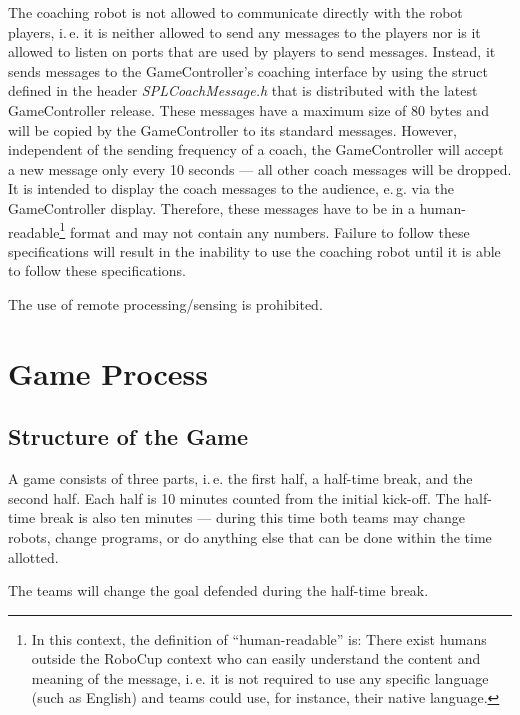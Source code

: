 \documentclass[12pt]{article}
\newcommand{\ie}{\mbox{i.\,e.}\xspace}
\newcommand{\eg}{\mbox{e.\,g.}\xspace}
\begin{document}
The coaching robot is not allowed to communicate directly with the robot players, \ie it is neither allowed to send any messages to the players nor is it allowed to listen on ports that are used by players to send messages. Instead, it sends messages to the GameController's coaching interface by using the struct defined in the header \emph{SPLCoachMessage.h} that is distributed with the latest GameController release. These messages have a maximum size of 80 bytes and will be copied by the GameController to its standard messages. However, independent of the sending frequency of a coach, the GameController will accept a new message only every 10 seconds --- all other coach messages will be dropped.  It is intended to display the coach messages to the audience, \eg via the GameController display. Therefore, these messages have to be in a human-readable\footnote{In this context, the definition of ``human-readable'' is: There exist humans outside the RoboCup context who can easily understand the content and meaning of the message, \ie it is not required to use any specific language (such as English) and teams could use, for instance, their native language.} format and may not contain any numbers.  Failure to follow these specifications will result in the inability to use the coaching robot until it is able to follow these specifications.

The use of remote processing/sensing is prohibited.


\newpage


\section{Game Process}
\label{sec:game_process}

\subsection{Structure of the Game}
\label{sec:game_struct}

A game consists of three parts, \ie the first half, a half-time break, and the second half. Each half is 10 minutes counted from the initial kick-off. The half-time break is also ten minutes --- during this time both teams may change robots, change programs, or do anything else that can be done within the time allotted. 

The teams will change the goal defended during the half-time break.
\end{document}
